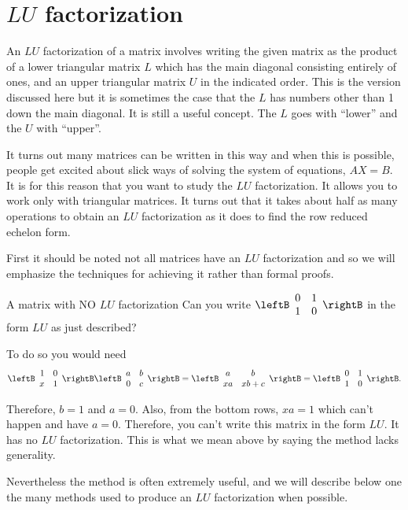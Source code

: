 \section{$LU$ factorization}

An $LU$ factorization of a matrix involves writing the given matrix as the
product of a lower triangular matrix $L$ which has the main diagonal consisting
entirely of ones, and an upper triangular matrix $U$ in the indicated
order. This is the version discussed here but it is sometimes the case that
the $L$ has numbers other than 1 down the main diagonal. It is still a
useful concept. The $L$ goes with ``lower'' and the $U$ with ``upper''.


It turns out many matrices can be written in this way and when this is
possible, people get excited about slick ways of solving the system of
equations, $AX=B$. It is for this reason that you want to
study the $LU$ factorization. It allows you to work only with
triangular matrices. It turns out that it takes about half as many
operations to obtain an $LU$ factorization as it does to find the row
reduced echelon form.

First it should be noted not all matrices have an $LU$ factorization and so
we will emphasize the techniques for achieving it rather than formal proofs.

\begin{example}{A matrix with NO $LU$ factorization}{}
Can you write $\leftB
\begin{array}{rr}
0 & 1 \\
1 & 0
\end{array}
\rightB $ in the form $LU$ as just described?
\end{example}

\begin{solution}
To do so you would need 
\begin{equation*}
\leftB 
\begin{array}{rr}
1 & 0 \\ 
x & 1
\end{array}
\rightB \leftB 
\begin{array}{rr}
a & b \\ 
0 & c
\end{array}
\rightB =\allowbreak \leftB 
\begin{array}{cc}
a & b \\ 
xa & xb+c
\end{array}
\rightB =\leftB 
\begin{array}{rr}
0 & 1 \\ 
1 & 0
\end{array}
\rightB .
\end{equation*}

Therefore, $b=1$ and $a=0.$ Also, from the bottom rows, $xa=1$ which can't
happen and have $a=0.$ Therefore, you can't write this matrix in the form $%
LU.$ It has no $LU$ factorization. This is what we mean above by saying the
method lacks generality.

Nevertheless the method is often extremely useful, and we will describe
below one the many methods used to produce an $LU$ factorization when
possible.
\end{solution}